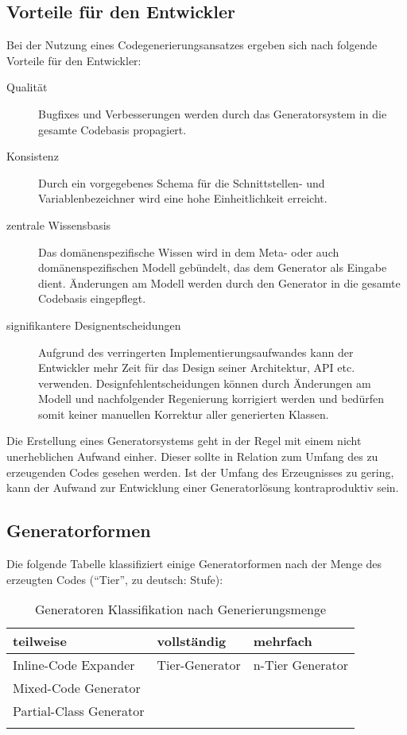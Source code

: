 \subsection{Vorteile für den Entwickler}
\label{sec:advantages_for_the_developer}

Bei der Nutzung eines Codegenerierungsansatzes ergeben sich nach \cite[][S. 15]{herrington2003code} folgende Vorteile für den Entwickler:

\begin{description}
    \item[Qualität]
        Bugfixes und Verbesserungen werden durch das Generatorsystem in die gesamte Codebasis propagiert.
    \item[Konsistenz]
        Durch ein vorgegebenes Schema für die Schnittstellen- und Variablenbezeichner wird eine hohe Einheitlichkeit erreicht.
    \item[zentrale Wissensbasis]
        Das domänenspezifische Wissen wird in dem Meta- oder auch domänenspezifischen Modell gebündelt, das dem Generator als Eingabe dient. Änderungen am Modell werden durch den Generator in die gesamte Codebasis eingepflegt.
    \item[signifikantere Designentscheidungen]
        Aufgrund des verringerten Implementierungsaufwandes kann der Entwickler mehr Zeit für das Design seiner Architektur, \gls{API} etc. verwenden. Designfehlentscheidungen können durch Änderungen am Modell und nachfolgender Regenierung korrigiert werden und bedürfen somit keiner manuellen Korrektur aller generierten Klassen.
\end{description}

Die Erstellung eines Generatorsystems geht in der Regel mit einem nicht unerheblichen Aufwand einher. Dieser sollte in Relation zum Umfang des zu erzeugenden Codes gesehen werden.
Ist der Umfang des Erzeugnisses zu gering, kann der Aufwand zur Entwicklung einer Generatorlösung kontraproduktiv sein.

\subsection{Generatorformen}
\label{sec:generator_models}

Die folgende Tabelle klassifiziert einige Generatorformen nach der Menge des erzeugten Codes (\enquote{Tier}, zu deutsch: Stufe):
\begin{table}[htb]
    \begin{longtable}[c]{l l l}
        \toprule
        \rowcolor{lightgray}
        \textbf{teilweise}   & \textbf{vollständig}     & \textbf{mehrfach}\\
        \midrule
        Inline-Code Expander    & Tier-Generator    & n-Tier Generator\\
        Mixed-Code Generator & &\\
        Partial-Class Generator & & \\
        \bottomrule
        \caption{Generatoren Klassifikation nach Generierungsmenge}
        \label{tab:generatorclassification}
    \end{longtable} 
\end{table}

